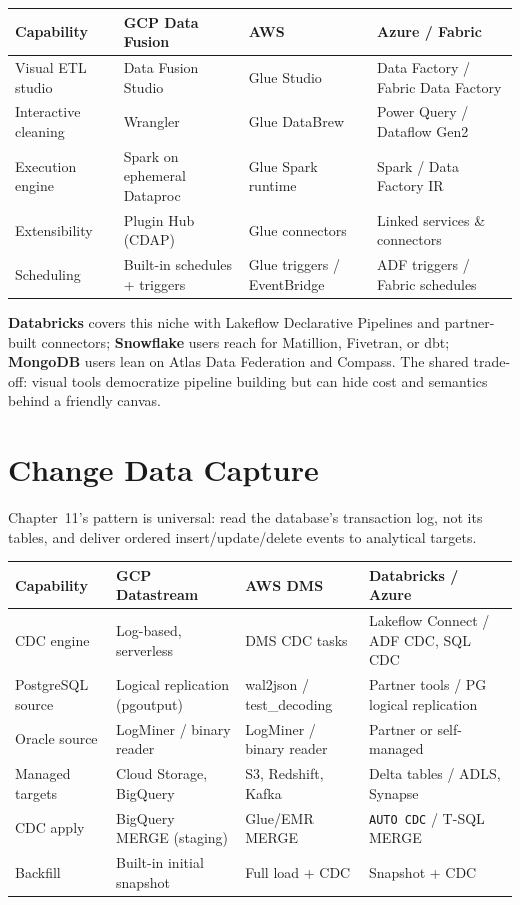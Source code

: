 \begin{center}
\footnotesize
\begin{tabular}{@{}p{2.8cm}p{3.0cm}p{3.0cm}p{3.4cm}@{}}
\toprule
\textbf{Capability} & \textbf{GCP Data Fusion} & \textbf{AWS} & \textbf{Azure / Fabric} \\
\midrule
Visual ETL studio & Data Fusion Studio & Glue Studio & Data Factory / Fabric Data Factory \\
Interactive cleaning & Wrangler & Glue DataBrew & Power Query / Dataflow Gen2 \\
Execution engine & Spark on ephemeral Dataproc & Glue Spark runtime & Spark / Data Factory IR \\
Extensibility & Plugin Hub (CDAP) & Glue connectors & Linked services \& connectors \\
Scheduling & Built-in schedules + triggers & Glue triggers / EventBridge & ADF triggers / Fabric schedules \\
\bottomrule
\end{tabular}
\end{center}

\noindent \textbf{Databricks} covers this niche with Lakeflow Declarative Pipelines and
partner-built connectors; \textbf{Snowflake} users reach for Matillion, Fivetran, or dbt;
\textbf{MongoDB} users lean on Atlas Data Federation and Compass. The shared trade-off: visual
tools democratize pipeline building but can hide cost and semantics behind a friendly canvas.

\section{Change Data Capture}
%
Chapter~11's pattern is universal: read the database's transaction log, not its tables, and
deliver ordered insert/update/delete events to analytical targets.

\begin{center}
\footnotesize
\begin{tabular}{@{}p{2.8cm}p{3.0cm}p{3.0cm}p{3.4cm}@{}}
\toprule
\textbf{Capability} & \textbf{GCP Datastream} & \textbf{AWS DMS} & \textbf{Databricks / Azure} \\
\midrule
CDC engine & Log-based, serverless & DMS CDC tasks & Lakeflow Connect / ADF CDC, SQL CDC \\
PostgreSQL source & Logical replication (pgoutput) & wal2json / test\_decoding & Partner tools / PG logical replication \\
Oracle source & LogMiner / binary reader & LogMiner / binary reader & Partner or self-managed \\
Managed targets & Cloud Storage, BigQuery & S3, Redshift, Kafka & Delta tables / ADLS, Synapse \\
CDC apply & BigQuery MERGE (staging) & Glue/EMR MERGE & \texttt{AUTO CDC} / T-SQL MERGE \\
Backfill & Built-in initial snapshot & Full load + CDC & Snapshot + CDC \\
\bottomrule
\end{tabular}
\end{center}

